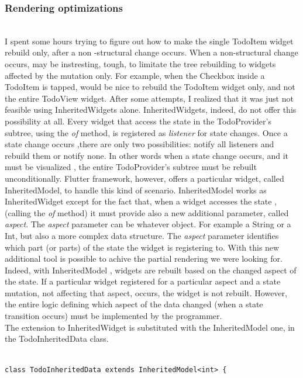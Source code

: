\subsubsection{Rendering optimizations} \mbox{} \\
\label{subpar:render_optimizations_inherited_widget}
I spent some hours trying to figure out how to make the single TodoItem widget rebuild only, after a non -structural change occurs. When a non-structural change occurs, may be instresting, tough, to limitate the tree rebuilding  to widgets affected by the mutation only. For example, when the Checkbox inside a TodoItem is tapped, would be nice to rebuild the TodoItem widget only, and not the entire TodoView widget. After some attempts, I realized that it was just not feasible using InheritedWidgets alone. InheritedWidgets, indeed, do not offer this possibility at all. Every widget that access the state in the TodoProvider’s subtree, using the \textit{of} method, is registered as \textit{listener} for state changes. Once a state change occurs ,there are only two possibilities: notify all listeners and rebuild them or notify none. In other words when a state change occurs, and it must be visualized , the entire TodoProvider’s subtree must be rebuilt unconditionally. Flutter framework, however, offers a particular widget, called InheritedModel, to handle this kind of scenario. InheritedModel works as InheritedWidget except for the fact that, when a widget accesses the state ,(calling the \textit{of} method) it must provide also a new additional parameter, called \textit{aspect}. The \textit{aspect} parameter can be whatever object. For example a String or a Int, but also a more complex data structure. The \textit{aspect} parameter identifies which part (or parts) of the state the widget is registering to. 
With this new additional tool is possible to achive the partial rendering we were looking for. Indeed, with InheritedModel , widgets are rebuilt based on the changed aspect of the state. If a particular widget registered for a particular aspect and a state mutation, not affecting that aspect, occurs, the widget is not rebuilt. However, the entire logic defining which aspect of the data changed (when a state transition occurs) must be implemented by the programmer.\\
The extension to InheritedWidget is substituted with the InheritedModel one, in the
TodoInheritedData class.
\mbox{}\\
\begin{code}
\mbox{}
\label{code:2.44}
\begin{verbatim}

class TodoInheritedData extends InheritedModel<int> {
\end{verbatim}
\end{code}
